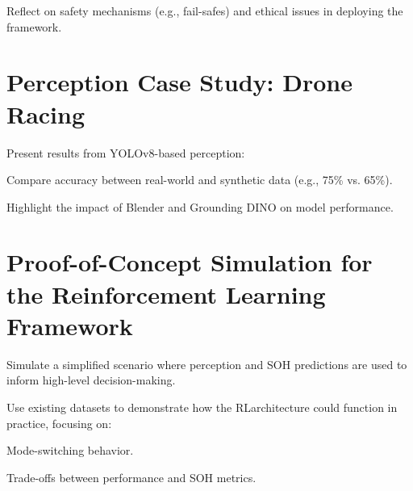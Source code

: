 Reflect on safety mechanisms (e.g., fail-safes) and ethical issues in deploying the framework.


\section{Perception Case Study: Drone Racing}

Present results from YOLOv8-based perception:

Compare accuracy between real-world and synthetic data (e.g., 75\% vs. 65\%).

Highlight the impact of Blender and Grounding DINO on model performance.

\section{Proof-of-Concept Simulation for the Reinforcement Learning Framework}

Simulate a simplified scenario where perception and SOH predictions are used to inform high-level decision-making.

Use existing datasets to demonstrate how the RLarchitecture could function in practice, focusing on:

Mode-switching behavior.

Trade-offs between performance and \gls{SOH} metrics.

\endinput